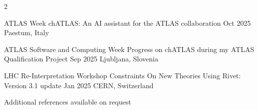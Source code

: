 \documentclass[10pt,a4paper,ragged2e,withhyper,normalphoto]{config/altacv}
\begin{document}
\begin{paracol}{2}

\cvevent
{ATLAS Week}
{chATLAS: An AI assistant for the ATLAS collaboration}
{Oct 2025}
{Paestum, Italy}

\cvevent
{ATLAS Software and Computing Week}
{Progress on chATLAS during my ATLAS Qualification Project}
{Sep 2025}
{Ljubljana, Slovenia}

\cvevent
{LHC Re-Interpretation Workshop}
{Constraints On New Theories Using Rivet: Version 3.1 update}
{Jan 2025}
{CERN, Switzerland}










\divider %

Additional references available on request

\end{paracol}
\end{document}
